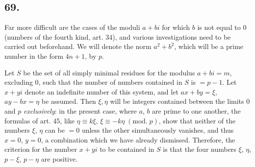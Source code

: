 \documentclass[twoside,12pt, showframe]{memoir}
\renewcommand{\pmod}[1]{\;(\textrm{mod.}\;#1)}
\begin{document}
\subsection*{69.}

Far more difficult are the cases of the moduli \(a+b i\) for which \(b\) is not equal to 0 (numbers of the fourth kind, art. 34), and various investigations need to be carried out beforehand. We will denote the norm \(a^2+b^2\), which will be a prime number in the form \(4n+1\), by \(p\).

Let \({S}\) be the set of all simply minimal residues for the modulus \(a+bi=m\), excluding 0, such that the number of numbers contained in \(S\) is \(=p-1\). Let \(x+yi\) denote an indefinite number of this system, and let \(ax+by=\xi\), \(ay-bx=\eta\) be assumed. Then \(\xi, \eta\) will be integers contained between the limits 0 and \(p\) \textit{exclusively}: in the present case, where \(a\), \(b\) are prime to one another, the formulas of art. 45, like \(\eta \equiv k \xi\), \(\xi \equiv-k \eta\pmod{p}\), show that neither of the numbers \(\xi\), \(\eta\) can be \(=0\) unless the other simultaneously vanishes, and thus \(x=0\), \(y=0\), a combination which we have already dismissed. Therefore, the criterion for the number \(x+yi\) to be contained in \(S\) is that the four numbers \(\xi\), \(\eta\), \(p-\xi\), \(p-\eta\) are positive.
%
\end{document}

